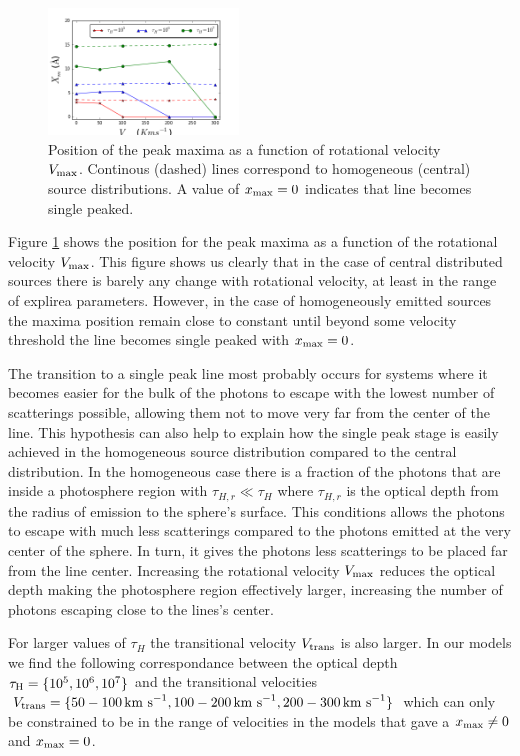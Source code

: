 \documentclass[usenatbib]{mn2e}
\newcommand{\kms}{{\ifmmode{{\mathrm{\,km\ s}^{-1}}}\else{\,km~s$^{-1}$}\fi}}
\begin{document}
\begin{figure}
    \includegraphics[width=0.45\textwidth]{maximumvsVmax.png}
\caption{Position of the peak maxima as a function of rotational
  velocity $V_{\rm max}$. Continous (dashed) lines correspond to
  homogeneous (central) source distributions. A value of $x_{\rm
    max}=0$ indicates that line becomes single
  peaked. \label{fig:maximumsvsvelocity}}  
\end{figure}


Figure \ref{fig:maximumsvsvelocity} shows the position for the peak
maxima as a function of the rotational velocity $V_{\rm max}$. This
figure shows us clearly that in the case of central distributed
sources there is barely any change with rotational velocity, at least
in the range of explirea parameters. However, in the case of
homogeneously emitted sources the maxima position remain close to
constant until beyond some velocity threshold the line becomes single
peaked with $x_{\rm max}=0$. 

The transition to a single peak line most probably occurs for systems
where it  becomes easier for the bulk of the photons to escape with the lowest
number of scatterings possible, allowing them not to move very far
from the center of the line. This hypothesis can also help to explain how the
single peak stage is easily achieved in the homogeneous source
distribution compared to the central distribution. In the homogeneous
case there is a fraction of the photons that are inside a photosphere region with
$\tau_{H,r}\ll \tau_{H}$ where $\tau_{H,r}$ is the optical depth from
the radius of emission to the sphere's surface. This conditions allows
the photons to escape with much less scatterings compared to the
photons emitted at the very center of the sphere. In turn, it gives
the photons less scatterings to be placed far from the line
center. Increasing the rotational velocity $V_{\rm max}$ reduces the
optical depth making the  photosphere region effectively larger,
increasing the number of photons escaping close to the lines's center.

For larger values of $\tau_{H}$ the transitional velocity $V_{\rm
  trans}$ is also larger. In our models we find the following
correspondance between the optical depth $\tau_{\rm H}=\{10^5, 10^6,
10^7\}$ and the transitional velocities $V_{\rm
  trans}=\{50-100\kms, 100-200\kms, 200-300\kms\}$ which can only be
constrained to be in the range of velocities in the models that gave a $x_{\rm
  max}\neq 0$ and $x_{\rm max}=0$.  
\end{document}
